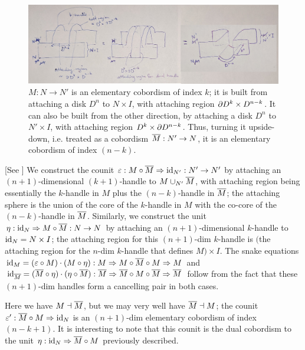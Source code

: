 \documentclass[12pt]{article}
\newcommand{\disk}[1]{{D^{#1}}}
\begin{document}
\begin{figure}[ht]
\includegraphics[width=15cm]{diagram-dual-handle.jpg}
\caption{$M:N \to N'$ is an elementary cobordism
of index $k$; it is built from attaching a disk $\disk{n}$
to $N \times I$,
with attaching region $\del \disk{k} \times \disk{n-k}$.
It can also be built from the other direction,
by attaching a disk $\disk{n}$
to $N' \times I$,
with attaching region $\disk{k} \times \del \disk{n-k}$.
Thus, turning it upside-down, i.e.
treated as a cobordism $\overline{M}: N' \to N$,
it is an elementary cobordism of index $(n-k)$.
}
\label{f:dual-handle}
\end{figure}

[See ]
We construct the counit
$\varepsilon: M \circ \overline{M} \Rightarrow \operatorname{id}_{N'} : N' \to N'$
by attaching an
$(n+1)$-dimensional $(k+1)$-handle to $M \cup_{N'} \overline{M}$,
with attaching region being essentially the
$k$-handle in $M$ plus the $(n-k)$-handle in $\overline{M}$;
the attaching sphere is the union of the core of the
$k$-handle in $M$
with the co-core of the $(n-k)$-handle in $\overline{M}$.
Similarly,
we construct the unit
$\eta: \operatorname{id}_N \Rightarrow M \circ \overline{M} : N \to N$
by attaching an
$(n+1)$-dimensional $k$-handle to $\operatorname{id}_N = N \times I$;
the attaching region for this $(n+1)$-dim $k$-handle
is
$($the attaching region for the $n$-dim $k$-handle that defines
$M) \times I$.
The snake equations
$\operatorname{id}_M = (\varepsilon \circ M) \cdot (M \circ \eta):
M \Rightarrow M \circ \overline{M} \circ M \Rightarrow M$
and
$\operatorname{id}_{\overline{M}} = (\overline{M} \circ \eta) \cdot (\eta \circ \overline{M}):
\overline{M} \Rightarrow \overline{M} \circ M \circ \overline{M} \Rightarrow \overline{M}$
follow from the fact that
these $(n+1)$-dim handles form a cancelling pair
in both cases.

Here we have $M \dashv \overline{M}$,
but we may very well have $\overline{M} \dashv M$;
the counit $\varepsilon': \overline{M} \circ M \Rightarrow \operatorname{id}_N$
is an $(n+1)$-dim elementary cobordism
of index $(n-k+1)$.
It is interesting to note that
this counit is the dual cobordism to the unit
$\eta: \operatorname{id}_N \Rightarrow \overline{M} \circ M$
previously described.
\end{document}

